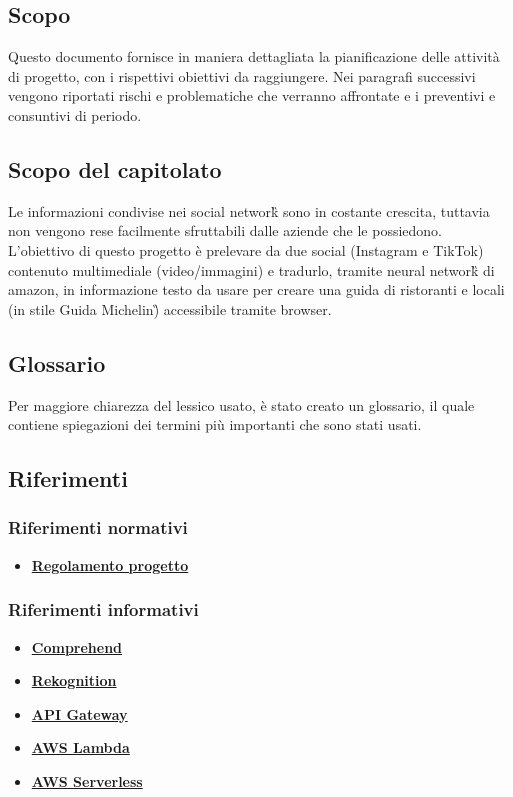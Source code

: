 \subsection{Scopo}
Questo documento fornisce in maniera dettagliata la pianificazione delle attività di progetto, con i rispettivi obiettivi da raggiungere. Nei paragrafi successivi vengono riportati rischi e problematiche che verranno affrontate e i preventivi e consuntivi di periodo.

\subsection{Scopo del capitolato}
Le informazioni condivise nei social network\G{} sono in costante crescita, tuttavia non vengono rese facilmente sfruttabili dalle aziende che le possiedono. L'obiettivo di questo progetto è prelevare da due social (Instagram e TikTok) contenuto multimediale (video/immagini) e tradurlo, tramite neural network\G{} di amazon, in informazione testo da usare per creare una guida di ristoranti e locali (in stile Guida Michelin\G) accessibile tramite browser.

\subsection{Glossario}
Per maggiore chiarezza del lessico usato, è stato creato un glossario, il quale contiene spiegazioni dei termini più importanti che sono stati usati.

\subsection{Riferimenti} %
\subsubsection{Riferimenti normativi}
\begin{itemize}
	\item
	\href{https://www.math.unipd.it/~tullio/IS-1/2021/Dispense/PD2.pdf}{\textbf{Regolamento progetto}}
	
\end{itemize}
\subsubsection{Riferimenti informativi}
\begin{itemize}
	\item \href{https://docs.aws.amazon.com/comprehend/latest/dg/what-is.html}{\textbf{Comprehend}}
	\item
	\href{https://docs.aws.amazon.com/rekognition/latest/dg/what-is.html}{\textbf{Rekognition}}
	\item
	\href{https://docs.aws.amazon.com/apigateway/latest/developerguide/welcome.html}{\textbf{API Gateway}}
	\item
	\href{https://docs.aws.amazon.com/lambda/latest/dg/welcome.html}{\textbf{AWS Lambda}}
	\item
	\href{https://docs.aws.amazon.com/serverless-application-model/latest/developerguide/what-is-sam.html}{\textbf{AWS Serverless}}
\end{itemize}
